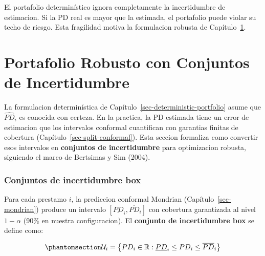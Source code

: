 \documentclass[
  spanish,
  11pt,
  letterpaper,
]{scrbook}
\theoremstyle{plain}
\theoremstyle{remark}
\begin{document}
\begin{tcolorbox}[enhanced jigsaw, arc=.35mm, bottomrule=.15mm, bottomtitle=1mm, breakable, colback=white, colbacktitle=quarto-callout-warning-color!10!white, colframe=quarto-callout-warning-color-frame, coltitle=black, left=2mm, leftrule=.75mm, opacityback=0, opacitybacktitle=0.6, rightrule=.15mm, title=\textcolor{quarto-callout-warning-color}{\faExclamationTriangle}\hspace{0.5em}{Fragilidad del baseline determinístico}, titlerule=0mm, toprule=.15mm, toptitle=1mm]

El portafolio determinístico ignora completamente la incertidumbre de
estimacion. Si la PD real es mayor que la estimada, el portafolio puede
violar su techo de riesgo. Esta fragilidad motiva la formulacion robusta
de Capítulo~\ref{sec-robust-portfolio}.

\end{tcolorbox}

\chapter{Portafolio Robusto con Conjuntos de
Incertidumbre}\label{sec-robust-portfolio}

La formulacion determinística de
Capítulo~\ref{sec-deterministic-portfolio} asume que \(\widehat{PD}_i\)
es conocida con certeza. En la practica, la PD estimada tiene un error
de estimacion que los intervalos conformal cuantifican con garantias
finitas de cobertura (Capítulo~\ref{sec-split-conformal}). Esta seccion
formaliza como convertir esos intervalos en \textbf{conjuntos de
incertidumbre} para optimizacion robusta, siguiendo el marco de
Bertsimas y Sim (2004).

\subsection{Conjuntos de incertidumbre
box}\label{conjuntos-de-incertidumbre-box}

Para cada prestamo \(i\), la prediccion conformal Mondrian
(Capítulo~\ref{sec-mondrian}) produce un intervalo
\([\underline{PD}_i, \overline{PD}_i]\) con cobertura garantizada al
nivel \(1 - \alpha\) (90\% en nuestra configuracion). El
\textbf{conjunto de incertidumbre box} se define como:

\begin{equation}\protect\phantomsection\label{eq-box-uncertainty}{
\mathcal{U}_i = \left\{ PD_i \in \mathbb{R} : \underline{PD}_i \leq PD_i \leq \overline{PD}_i \right\}
}\end{equation}
\end{document}
